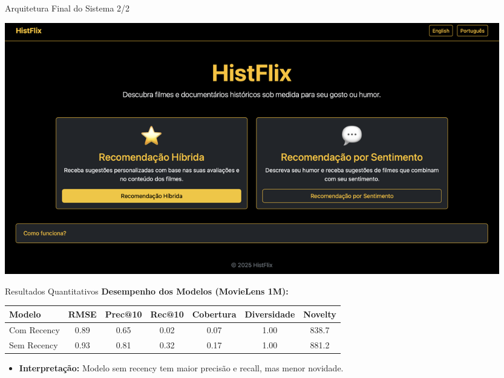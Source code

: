 \documentclass{beamer}
\begin{document}
\begin{frame}{Arquitetura Final do Sistema 2/2}
    \begin{center}
        \includegraphics[width=0.95\textwidth]{../pictures/home_page.png}
    \end{center}
\end{frame}

\begin{frame}{Resultados Quantitativos}
    \textbf{Desempenho dos Modelos (MovieLens 1M):}
    \vspace{0.3cm}
    \begin{tabular}{lcccccc}
        \toprule
        \textbf{Modelo} & \textbf{RMSE} & \textbf{Prec@10} & \textbf{Rec@10} & \textbf{Cobertura} & \textbf{Diversidade} & \textbf{Novelty} \\
        \midrule
        Com Recency & 0.89 & 0.65 & 0.02 & 0.07 & 1.00 & 838.7 \\
        Sem Recency & 0.93 & 0.81 & 0.32 & 0.17 & 1.00 & 881.2 \\
        \bottomrule
    \end{tabular}
    \vspace{0.3cm}
    \begin{itemize}
        \item \textbf{Interpretação:} Modelo sem recency tem maior precisão e recall, mas menor novidade.
    \end{itemize}
\end{frame}
\end{document}
